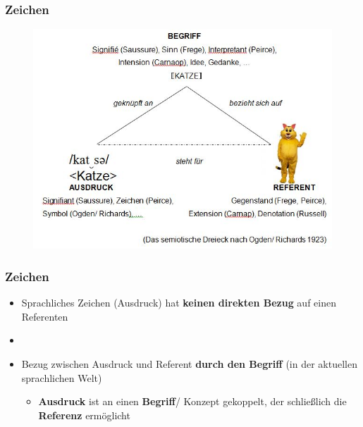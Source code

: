 \begin{frame}
\frametitle{Zeichen}

\begin{figure}
\centering
\includegraphics[scale=0.5]{material/07SemiotischesDreieck}
\end{figure}

\end{frame}



\begin{frame}
\frametitle{Zeichen}

\begin{itemize}
	\item Sprachliches Zeichen (Ausdruck) hat \textbf{keinen direkten Bezug} auf einen Referenten
	\item []	
	\item Bezug zwischen Ausdruck und Referent \textbf{durch den Begriff} (in der aktuellen sprachlichen Welt)

	\begin{itemize}
		\item \textbf{Ausdruck} ist an einen \textbf{Begriff}/ Konzept gekoppelt, der schließlich die \textbf{Referenz} ermöglicht
	\end{itemize}
	
\end{itemize}
	
\end{frame}



